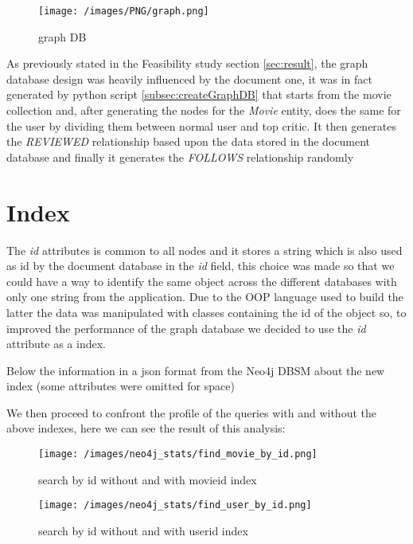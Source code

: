 \begin{figure}[H]
\begin{center}
\texttt{[image: /images/PNG/graph.png]}
\caption{graph DB}
\label{fig:graphDB}
\end{center}
\end{figure}

As previously stated in the Feasibility study section \ref{sec:result}, the graph database design was heavily influenced by the document one, it was in fact generated by python script \cref{subsec:createGraphDB} that starts from the movie collection and, after generating the nodes for the \emph{Movie} entity, does the same for the user by dividing them between normal user and top critic. It then generates the \emph{REVIEWED} relationship based upon the data stored in the document database and finally it generates the \emph{FOLLOWS} relationship randomly

\section{Index}
The \emph{id} attributes is common to all nodes and it stores a string which is also used as id by the document database in the \emph{\textunderscore id} field, this choice was made so that we could have a way to identify the same object across the different databases with only one string from the application. Due to the OOP language used to build the latter the data was manipulated with classes containing the id of the object so, to improved the performance of the graph database we decided to use the \emph{id} attribute as a index. 

Below the information in a json format from the Neo4j DBSM about the new index (some attributes were omitted for space)


We then proceed to confront the profile of the queries with and without the above indexes, here we can see the result of this analysis: 
\begin{figure}[H]
\begin{center}
\texttt{[image: /images/neo4j\_stats/find\_movie\_by\_id.png]}
\caption{search by id without and with movie\textunderscore id \textunderscore index}
\label{fig:movieId}
\end{center}
\end{figure}

\begin{figure}[H]
\begin{center}
\texttt{[image: /images/neo4j\_stats/find\_user\_by\_id.png]}
\caption{search by id without and with user\textunderscore id \textunderscore index}
\label{fig:userId}
\end{center}
\end{figure}


